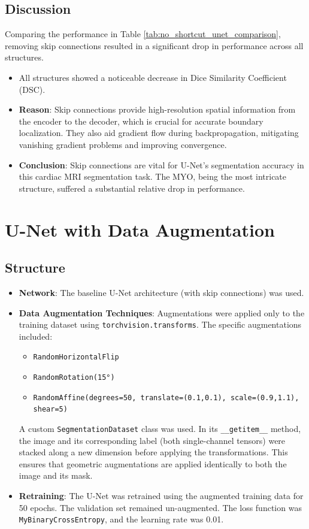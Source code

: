 \documentclass{article}
\begin{document}
\subsection{Discussion}
Comparing the performance in Table \ref{tab:no_shortcut_unet_comparison}, removing skip connections resulted in a significant drop in performance across all structures.
\begin{itemize}
  \item All structures showed a noticeable decrease in Dice Similarity Coefficient (DSC).
  \item \textbf{Reason}: Skip connections provide high-resolution spatial information from the encoder to the decoder, which is crucial for accurate boundary localization. They also aid gradient flow during backpropagation, mitigating vanishing gradient problems and improving convergence.
  \item \textbf{Conclusion}: Skip connections are vital for U-Net's segmentation accuracy in this cardiac MRI segmentation task. The MYO, being the most intricate structure, suffered a substantial relative drop in performance.
\end{itemize}


\section{U-Net with Data Augmentation}

\subsection{Structure}
\begin{itemize}
  \item \textbf{Network}: The baseline U-Net architecture (with skip connections) was used.
  \item \textbf{Data Augmentation Techniques}: Augmentations were applied only to the training dataset using \texttt{torchvision.transforms}. The specific augmentations included:
        \begin{itemize}
          \item \texttt{RandomHorizontalFlip}
          \item \texttt{RandomRotation(15°)}
          \item \texttt{RandomAffine(degrees=50, translate=(0.1,0.1), scale=(0.9,1.1), shear=5)}
        \end{itemize}
        A custom \texttt{SegmentationDataset} class was used. In its \texttt{\_\_getitem\_\_} method,
        the image and its corresponding label (both single-channel tensors) were stacked along a new dimension before applying the
        transformations. This ensures that geometric augmentations are applied identically to both the image and its mask.
  \item \textbf{Retraining}: The U-Net was retrained using the augmented training data for 50 epochs.
        The validation set remained un-augmented. The loss function was \texttt{MyBinaryCrossEntropy}, and the learning rate was 0.01.
\end{itemize}
\end{document}
